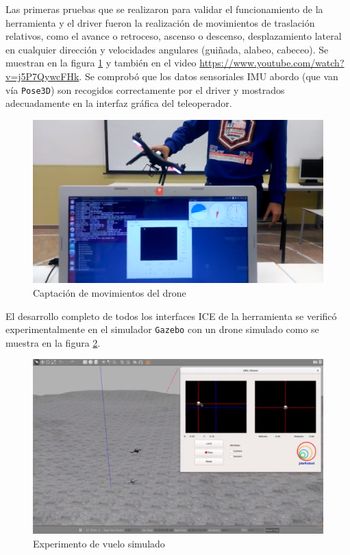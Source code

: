 Las primeras pruebas que se realizaron para validar el funcionamiento de la herramienta y el driver fueron la realización de movimientos de traslación relativos, como el avance o retroceso, ascenso o descenso, desplazamiento lateral en cualquier dirección y velocidades angulares (guiñada, alabeo, cabeceo). Se muestran en la figura \ref{fig:experimentoConUAV} y también en el video \url{https://www.youtube.com/watch?v=j5P7QywcFHk}. Se comprobó que los datos sensoriales IMU abordo (que van vía \texttt{Pose3D}) son recogidos correctamente por el driver y mostrados adecuadamente en la interfaz gráfica del teleoperador. 
\begin{figure}[H]
  \centering
  \includegraphics[scale=0.25]{imagenes/EXP1.png}
  \caption{Captación de movimientos del drone}
  \label{fig:experimentoConUAV}
\end{figure}

El desarrollo completo de todos los interfaces ICE de la herramienta se verificó experimentalmente en el simulador \texttt{Gazebo} con un drone simulado como se muestra en la figura \ref{fig:experimentoConUAVsimulado}. 

\begin{figure}[H]
  \centering
  \includegraphics[scale=0.25]{imagenes/GAZEBO.png}
  \caption{Experimento de vuelo simulado}
  \label{fig:experimentoConUAVsimulado}
\end{figure}

